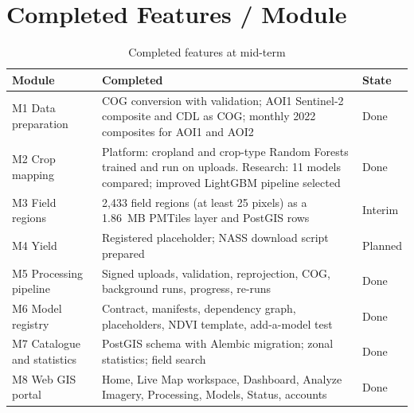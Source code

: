 \section{Completed Features / Module}
\begin{table}[htbp]
\centering\small
\caption{Completed features at mid-term}
\label{tab:completed}
\begin{tabularx}{\textwidth}{L{3.8cm} Y L{1.4cm}}
\toprule
\textbf{Module} & \textbf{Completed} & \textbf{State}\\
\midrule
M1 Data preparation & COG conversion with validation; AOI1 Sentinel-2 composite and CDL as COG; monthly 2022 composites for AOI1 and AOI2 & Done\\
M2 Crop mapping & Platform: cropland and crop-type Random Forests trained and run on uploads. Research: 11 models compared; improved LightGBM pipeline selected & Done\\
M3 Field regions & 2,433 field regions (at least 25 pixels) as a 1.86~MB PMTiles layer and PostGIS rows & Interim\\
M4 Yield & Registered placeholder; NASS download script prepared & Planned\\
M5 Processing pipeline & Signed uploads, validation, reprojection, COG, background runs, progress, re-runs & Done\\
M6 Model registry & Contract, manifests, dependency graph, placeholders, NDVI template, add-a-model test & Done\\
M7 Catalogue and statistics & PostGIS schema with Alembic migration; zonal statistics; field search & Done\\
M8 Web GIS portal & Home, Live Map workspace, Dashboard, Analyze Imagery, Processing, Models, Status, accounts & Done\\
\bottomrule
\end{tabularx}
\end{table}

